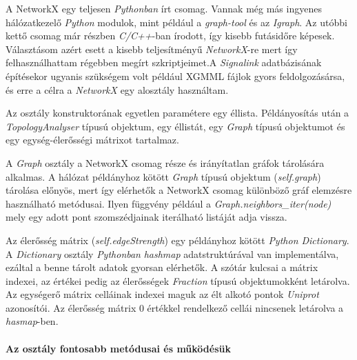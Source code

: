 \documentclass[a4paper,12pt]{article}
\begin{document}
		A NetworkX egy teljesen \textit{Pythonban} írt csomag. Vannak még más ingyenes hálózatkezelő \textit{Python} modulok, mint például a \textit{graph-tool} és az \textit{Igraph}. Az utóbbi kettő csomag már részben \textit{C/C++}-ban írodott, így kisebb futásidőre képesek. Választásom azért esett a kisebb teljesítményű \textit{NetworkX}-re mert így felhasználhattam régebben megírt szkriptjeimet.A \textit{Signalink} adatbázisának építésekor ugyanis szükségem volt például XGMML fájlok gyors feldolgozásársa, és erre a célra a \textit{NetworkX} egy alosztály használtam. 
		
		Az osztály konstruktorának egyetlen paramétere egy éllista. Példányosítás után a \textit{TopologyAnalyser} típusú objektum, egy éllistát, egy \textit{Graph} típusú objektumot és egy egység-élerősségi mátrixot tartalmaz.
		
		A \textit{Graph} osztály a NetworkX csomag része és irányítatlan gráfok tárolására alkalmas. A hálózat példányhoz kötött \textit{Graph} típusú objektum (\textit{self.graph}) tárolása előnyös, mert így elérhetők a NetworkX csomag különböző gráf elemzésre használható metódusai. Ilyen függvény például a \textit{Graph.neighbors\_iter(node)} mely egy adott pont szomszédjainak iterálható listáját adja vissza.
		
		Az élerősség mátrix (\textit{self.edgeStrength}) egy példányhoz kötött \textit{Python Dictionary}. A \textit{Dictionary} osztály   \textit{Pythonban} \textit{hashmap} adatstruktúrával van implementálva, ezáltal a benne tárolt adatok gyorsan elérhetők. A szótár kulcsai a mátrix indexei, az értékei pedig az élerősségek \textit{Fraction} típusú objektumokként letárolva. Az egységerő mátrix celláinak indexei maguk az élt alkotó pontok \textit{Uniprot} azonosítói. Az élerősség mátrix 0 értékkel rendelkező cellái nincsenek letárolva a \textit{hasmap}-ben.
		
		\paragraph{Az osztály fontosabb metódusai és működésük}
\end{document}
